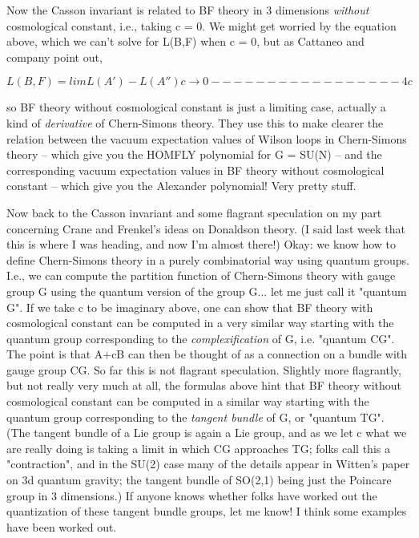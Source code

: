 Now the Casson invariant is related to BF theory in 3 dimensions 
\emph{without} cosmological constant, i.e., taking c = 0.  We might
get worried by the equation above, which we can't solve
for L(B,F) when c = 0, but as Cattaneo and company point out,


$$

L(B,F) = lim       L(A') - L(A'')
        c \to  0    -----------------
                         4c
$$
    

so BF theory without cosmological constant is just a limiting
case, actually a kind of \emph{derivative} of Chern-Simons theory.
They use this to make clearer the relation between the vacuum
expectation values of Wilson loops in Chern-Simons theory --
which give you the HOMFLY polynomial for G = SU(N) -- and
the corresponding vacuum expectation values in BF theory without
cosmological constant -- which give you the Alexander polynomial!
Very pretty stuff.

Now back to the Casson invariant and some flagrant speculation
on my part concerning Crane and Frenkel's ideas on Donaldson theory.
(I said last week that this is where I was heading, and now I'm
almost there!)  Okay: we know how to define Chern-Simons theory
in a purely combinatorial way using quantum groups.  I.e., we
can compute the partition function of Chern-Simons theory with
gauge group G using the quantum version of the group G... let
me just call it "quantum G".  If we take c to be imaginary above, 
one can show that BF theory with cosmological constant can be
computed in a very similar way starting with the quantum group
corresponding to the \emph{complexification} of G, i.e. 
"quantum CG".
The point is that A+cB can then be thought of as a connection on 
a bundle with gauge group CG.  So far this is not flagrant
speculation.  Slightly more flagrantly, but not really very much at 
all, the formulas above hint that BF theory without cosmological
constant can be computed in a similar way starting with the
quantum group corresponding to the \emph{tangent bundle} of G, or
"quantum TG".  (The tangent bundle of a Lie group is again
a Lie group, and as we let c  what we are really doing is
taking a limit in which CG approaches TG; folks call this a
"contraction", and in the SU(2) case many of the details appear
in Witten's paper on 3d quantum gravity; the tangent bundle
of SO(2,1) being just the Poincare group in 3 dimensions.)  If
anyone knows whether folks have worked out the quantization of
these tangent bundle groups, let me know!  I think some examples
have been worked out.

